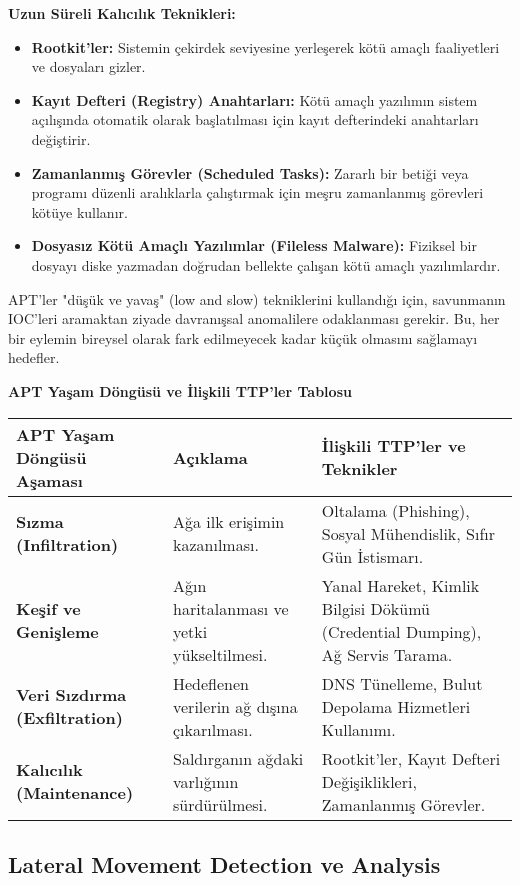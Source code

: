 \textbf{Uzun Süreli Kalıcılık Teknikleri:}

\begin{itemize}
    \item \textbf{Rootkit'ler:} Sistemin çekirdek seviyesine yerleşerek kötü amaçlı faaliyetleri ve dosyaları gizler.
    \item \textbf{Kayıt Defteri (Registry) Anahtarları:} Kötü amaçlı yazılımın sistem açılışında otomatik olarak başlatılması için kayıt defterindeki anahtarları değiştirir.
    \item \textbf{Zamanlanmış Görevler (Scheduled Tasks):} Zararlı bir betiği veya programı düzenli aralıklarla çalıştırmak için meşru zamanlanmış görevleri kötüye kullanır.
    \item \textbf{Dosyasız Kötü Amaçlı Yazılımlar (Fileless Malware):} Fiziksel bir dosyayı diske yazmadan doğrudan bellekte çalışan kötü amaçlı yazılımlardır.
\end{itemize}

APT'ler "düşük ve yavaş" (low and slow) tekniklerini kullandığı için, savunmanın IOC'leri aramaktan ziyade davranışsal anomalilere odaklanması gerekir. Bu, her bir eylemin bireysel olarak fark edilmeyecek kadar küçük olmasını sağlamayı hedefler.

\textbf{APT Yaşam Döngüsü ve İlişkili TTP'ler Tablosu}

\begin{tabularx}{\textwidth}{|l|X|X|}
\hline
\textbf{APT Yaşam Döngüsü Aşaması} & \textbf{Açıklama} & \textbf{İlişkili TTP'ler ve Teknikler} \\
\hline
\textbf{Sızma (Infiltration)} & Ağa ilk erişimin kazanılması. & Oltalama (Phishing), Sosyal Mühendislik, Sıfır Gün İstismarı. \\
\hline
\textbf{Keşif ve Genişleme} & Ağın haritalanması ve yetki yükseltilmesi. & Yanal Hareket, Kimlik Bilgisi Dökümü (Credential Dumping), Ağ Servis Tarama. \\
\hline
\textbf{Veri Sızdırma (Exfiltration)} & Hedeflenen verilerin ağ dışına çıkarılması. & DNS Tünelleme, Bulut Depolama Hizmetleri Kullanımı. \\
\hline
\textbf{Kalıcılık (Maintenance)} & Saldırganın ağdaki varlığının sürdürülmesi. & Rootkit'ler, Kayıt Defteri Değişiklikleri, Zamanlanmış Görevler. \\
\hline
\end{tabularx}

\subsection{Lateral Movement Detection ve Analysis}

